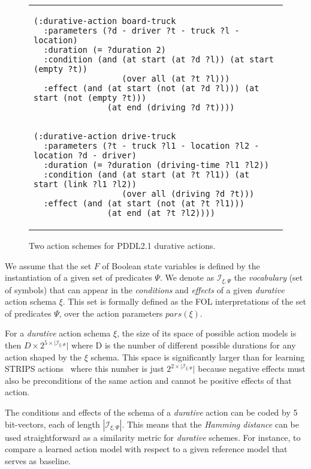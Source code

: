 \documentclass{ecai}
\begin{document}
\begin{figure}
  \begin{tabular}{p{\textwidth}}
\begin{tiny}    
\begin{verbatim}
(:durative-action board-truck
  :parameters (?d - driver ?t - truck ?l - location)
  :duration (= ?duration 2)
  :condition (and (at start (at ?d ?l)) (at start (empty ?t))
                  (over all (at ?t ?l)))
  :effect (and (at start (not (at ?d ?l))) (at start (not (empty ?t)))
               (at end (driving ?d ?t))))


(:durative-action drive-truck
  :parameters (?t - truck ?l1 - location ?l2 - location ?d - driver)
  :duration (= ?duration (driving-time ?l1 ?l2))
  :condition (and (at start (at ?t ?l1)) (at start (link ?l1 ?l2))
                  (over all (driving ?d ?t)))
  :effect (and (at start (not (at ?t ?l1))) 
               (at end (at ?t ?l2))))
\end{verbatim}
\end{tiny}    
\end{tabular}
\caption{\small Two action schemes for PDDL2.1 durative actions.}
\label{fig:exampleactions2}
\end{figure}

We assume that the set $F$ of Boolean state variables is defined by the instantiation of a given set of predicates $\Psi$. We denote as ${\mathcal I}_{\xi,\Psi}$ the {\em vocabulary} (set of symbols) that can appear in the {\em conditions} and {\em effects} of a given {\em durative} action schema $\xi$. This set is formally defined as the FOL interpretations of the set of predicates $\Psi$, over the action parameters $pars(\xi)$.

For a {\em durative} action schema $\xi$, the size of its space of possible action models is then $D\times 2^{5\times|{\mathcal I}_{\xi,\Psi}}|$ where D is the number of different possible durations for any action shaped by the $\xi$ schema. This space is significantly larger than for learning STRIPS actions~\cite{yang2007learning} where this number is just $2^{2\times|{\mathcal I}_{\xi,\Psi}}|$ because negative effects must also be preconditions of the same action and cannot be positive effects of that action.

The conditions and effects of the schema of a {\em durative} action can be coded by 5 bit-vectors, each of length $|{\mathcal I}_{\xi,\Psi}|$. This means that the {\em Hamming distance} can be used straightforward as a similarity metric for {\em durative} schemes. For instance, to compare a learned action model with respect to a given reference model that serves as baseline. 
\end{document}
